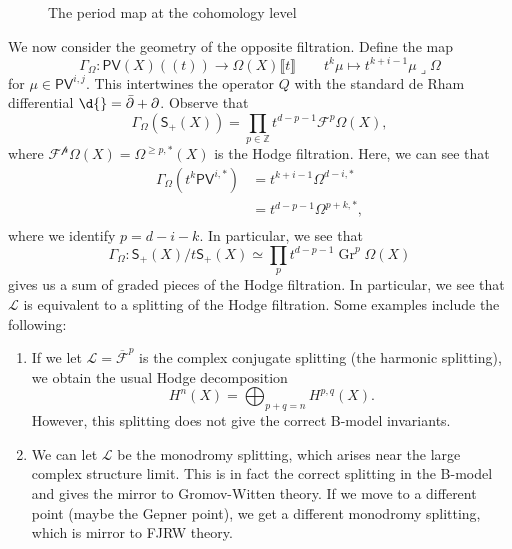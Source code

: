 \documentclass{amsart}
\theoremstyle{definition}
\theoremstyle{remark}
\theoremstyle{plain}
\theoremstyle{definition}
\theoremstyle{remark}
\newcommand{\Z}{\mathbb{Z}}
\newcommand{\mc}[1]{\mathcal{#1}}
\newcommand{\on}[1]{\operatorname{#1}}
\newcommand{\ms}[1]{\mathsf{#1}}
\newcommand{\ol}[1]{\overline{#1}}
\newcommand{\1}{\mathbf{1}}
\newcommand{\2}{\mathbf{2}}
\newcommand{\3}{\mathbf{3}}
\newcommand{\ps}[1]{\lBrack #1 \rBrack}
\newcommand{\ls}[1]{(\!( #1 )\!)}
\newcommand{\dbar}{\bar{\partial}}
\begin{document}
\begin{figure}[htpb]
\begin{center}
\end{center}
\caption{The period map at the cohomology level}%
\label{fig:cohomology-period-map}
\end{figure}

We now consider the geometry of the opposite filtration. Define the map
\[ \Gamma_{\Omega} \colon \ms{PV}(X)\ls{t} \to \Omega(X)\ps{t} \qquad t^k \mu \mapsto t^{k+i-1} \mu \lrcorner \Omega \]
for \(\mu \in \ms{PV}^{i,j}\). This intertwines the operator \(Q\) with the standard de Rham differential \(\d{} = \dbar + \partial\). Observe that 
\[ \Gamma_{\Omega}(\ms{S}_+(X)) = \prod_{p \in \Z} t^{d-p-1} \mc{F}^p \Omega(X), \]
where \(\mc{F^p}\Omega(X) = \Omega^{\geq p, *}(X)\) is the Hodge filtration. Here, we can see that
\begin{align*}
    \Gamma_{\Omega}(t^k \ms{PV}^{i, *}) &= t^{k+i-1} \Omega^{d-i, *} \\
    &= t^{d-p-1} \Omega^{p+k, *}, \\
\end{align*}
where we identify \(p = d-i-k\). In particular, we see that
\[ \Gamma_{\Omega} \colon \ms{S}_+(X) / t \ms{S}_+(X) \simeq \prod_p t^{d-p-1} \on{Gr}^p \Omega(X) \]
gives us a sum of graded pieces of the Hodge filtration. In particular, we see that \(\mc{L}\) is equivalent to a splitting of the Hodge filtration. Some examples include the following:
\begin{enumerate}
    \item If we let \(\mc{L} = \ol{\mc{F}}^p\) is the complex conjugate splitting (the harmonic splitting), we obtain the usual Hodge decomposition
    \[ H^n(X) = \bigoplus_{p+q=n} H^{p,q}(X). \]
    However, this splitting does not give the correct B-model invariants.
    \item We can let \(\mc{L}\) be the monodromy splitting, which arises near the large complex structure limit. This is in fact the correct splitting in the B-model and gives the mirror to Gromov-Witten theory. If we move to a different point (maybe the Gepner point), we get a different monodromy splitting, which is mirror to FJRW theory.
\end{enumerate}
\end{document}
